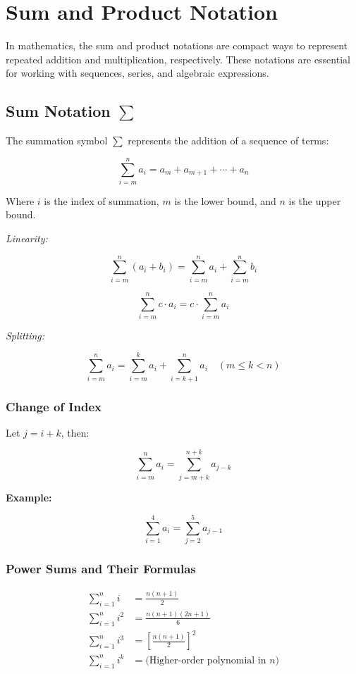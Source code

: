 \newpage
\section{Sum and Product Notation}

In mathematics, the sum and product notations are compact ways to represent repeated addition and multiplication, respectively. These notations are essential for working with sequences, series, and algebraic expressions.

\subsection{Sum Notation \texorpdfstring{\(\sum\)}{∑}}

The summation symbol \(\sum\) represents the addition of a sequence of terms:

\[
    \sum_{i = m}^{n} a_i = a_m + a_{m+1} + \cdots + a_n
\]

Where \(i\) is the index of summation, \(m\) is the lower bound, and \(n\) is the upper bound.
\vspace{\baselineskip}

\emph{Linearity:}

\[
    \sum_{i = m}^{n} (a_i + b_i) = \sum_{i = m}^{n} a_i + \sum_{i = m}^{n} b_i
\]
    
\[
    \sum_{i = m}^{n} c \cdot a_i = c \cdot \sum_{i = m}^{n} a_i
\]

\emph{Splitting:}
    
\[
    \sum_{i = m}^{n} a_i = \sum_{i = m}^{k} a_i + \sum_{i = k+1}^{n} a_i \quad (m \le k < n)
\]

\subsubsection{Change of Index}

Let \(j = i + k\), then:

\[
    \sum_{i = m}^{n} a_i = \sum_{j = m + k}^{n + k} a_{j - k}
\]

\textbf{Example:}
\vspace{\baselineskip}

\[
    \sum_{i = 1}^{4} a_i = \sum_{j = 2}^{5} a_{j - 1}
\]

\subsubsection{Power Sums and Their Formulas}

\begin{align*}
    \sum_{i = 1}^{n} i &= \frac{n(n+1)}{2} \\
    \sum_{i = 1}^{n} i^2 &= \frac{n(n+1)(2n+1)}{6} \\
    \sum_{i = 1}^{n} i^3 &= {\left[\frac{n(n+1)}{2}\right]}^2 \\
    \sum_{i = 1}^{n} i^k &= \text{(Higher-order polynomial in \(n\))}
\end{align*}

